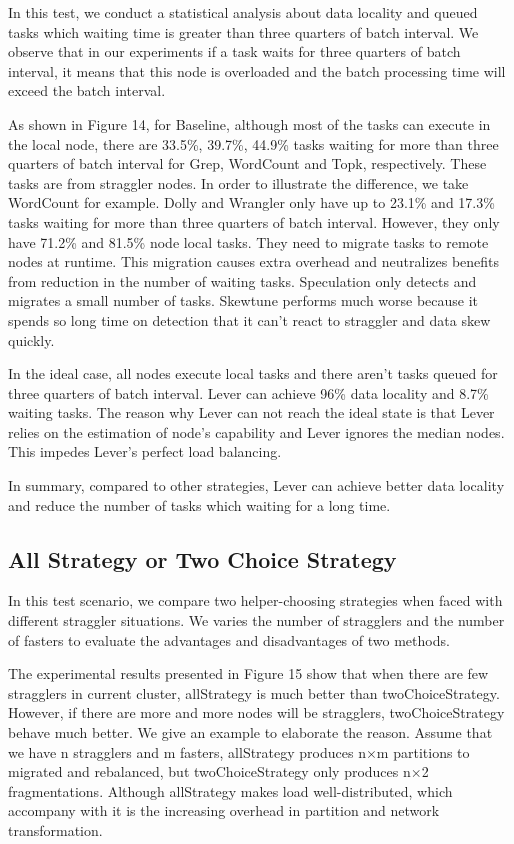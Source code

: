 \documentclass[10pt,conference,compsocconf,letterpaper]{IEEEtran}
\begin{document}
  In this test, we conduct a statistical analysis about data locality and queued tasks which waiting time is greater than three quarters of batch interval. We observe that in our experiments if a task waits for three quarters of batch interval, it means that this node is overloaded and the batch processing time will exceed the batch interval.

  As shown in Figure 14, for Baseline, although most of the tasks can execute in the local node, there are 33.5\%, 39.7\%, 44.9\% tasks waiting for more than three quarters of batch interval for Grep, WordCount and Topk, respectively. These tasks are from straggler nodes. In order to illustrate the difference, we take WordCount for example. Dolly and Wrangler only have up to 23.1\% and 17.3\% tasks waiting for more than three quarters of batch interval. However, they only have 71.2\% and 81.5\% node local tasks. They need to migrate tasks to remote nodes at runtime. This migration causes extra overhead and neutralizes benefits from reduction in the number of waiting tasks. Speculation only detects and migrates a small number of tasks. Skewtune performs much worse because it spends so long time on detection that it can't react to straggler and data skew quickly.

  In the ideal case, all nodes execute local tasks and there aren't tasks queued for three quarters of batch interval. Lever can achieve 96\% data locality and 8.7\% waiting tasks. The reason why Lever can not reach the ideal state is that Lever relies on the estimation of node's capability and Lever ignores the median nodes. This impedes Lever's perfect load balancing.

  In summary, compared to other strategies, Lever can achieve better data locality and reduce the number of tasks which waiting for a long time.

\subsection{All Strategy or Two Choice Strategy}

  In this test scenario, we compare two helper-choosing strategies when faced with different straggler situations. We varies the number of stragglers and the number of fasters to evaluate the advantages and disadvantages of two methods.

  The experimental results presented in Figure 15 show that when there are few stragglers in current cluster, allStrategy is much better than twoChoiceStrategy. However, if there are more and more nodes will be stragglers, twoChoiceStrategy behave much better. We give an example to elaborate the reason. Assume that we have n stragglers and m fasters, allStrategy produces n$\times$m partitions to migrated and rebalanced, but twoChoiceStrategy only produces n$\times$2 fragmentations. Although allStrategy makes load well-distributed, which accompany with it is the increasing overhead in partition and network transformation.
\end{document}
